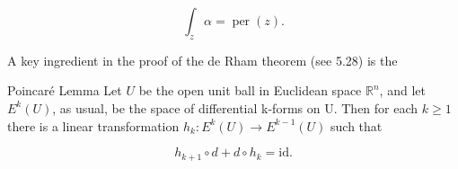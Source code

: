 \begin{equation}
\tag{4}\label{eq:4.17:4}
\int_{z}\alpha=\operatorname{per}(z).
\end{equation}

A key ingredient in the proof of the de Rham theorem (see 5.28) is the

\begin{lemma}{Poincaré Lemma}\label{thm:4.18}
Let $U$ be the open unit ball in Euclidean space  $ \mathbb{R}^n $, and let  $ E^k(U) $, as usual, be the space of differential k-forms on U. Then for each  $ k \geq 1 $ there is a linear transformation  $ h_k: E^k(U) \to E^{k-1}(U) $ such that 

\begin{equation}
\tag{1}\label{eq:4.18:1}
h_{k+1}\circ d+d\circ h_{k}=\mathrm{id}.
\end{equation}

\end{lemma}

